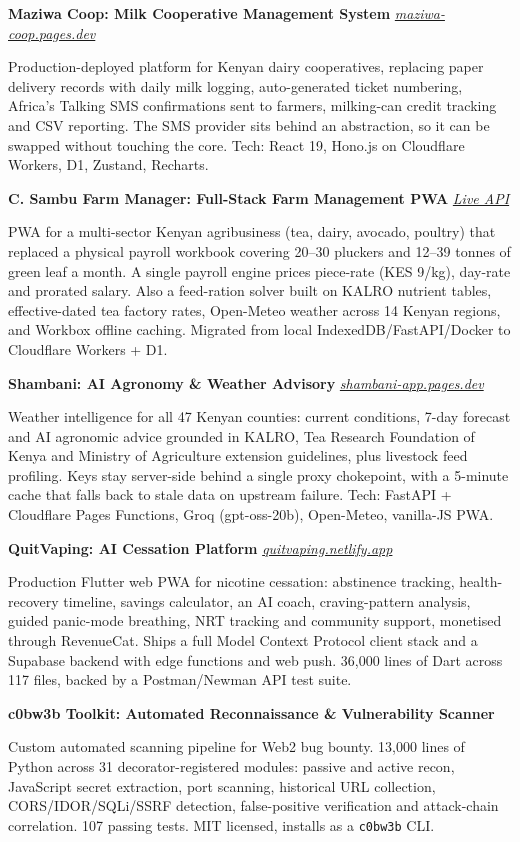 \documentclass[10pt,a4paper]{article}
\newcommand{\project}[2]{%
  \par\vspace{0.55em}%
  {\sffamily\bfseries #1}%
  \hfill{\small\itshape #2}\par%
  \vspace{0.15em}%
}
\begin{document}
\project{Maziwa Coop: Milk Cooperative Management System}
{\href{https://maziwa-coop.pages.dev}{maziwa-coop.pages.dev}}
\small
Production-deployed platform for Kenyan dairy cooperatives, replacing paper delivery records with daily milk logging, auto-generated ticket numbering, Africa's Talking SMS confirmations sent to farmers, milking-can credit tracking and CSV reporting. The SMS provider sits behind an abstraction, so it can be swapped without touching the core. Tech: React 19, Hono.js on Cloudflare Workers, D1, Zustand, Recharts.
\normalsize

\project{C. Sambu Farm Manager: Full-Stack Farm Management PWA}
  {\href{https://cs-farm-api.llakterian.workers.dev}{Live API}}
\small
PWA for a multi-sector Kenyan agribusiness (tea, dairy, avocado, poultry) that replaced a physical payroll workbook covering 20--30 pluckers and 12--39 tonnes of green leaf a month. A single payroll engine prices piece-rate (KES 9/kg), day-rate and prorated salary. Also a feed-ration solver built on KALRO nutrient tables, effective-dated tea factory rates, Open-Meteo weather across 14 Kenyan regions, and Workbox offline caching. Migrated from local IndexedDB/FastAPI/Docker to Cloudflare Workers + D1.
\normalsize

\project{Shambani: AI Agronomy \& Weather Advisory}
{\href{https://shambani-app.pages.dev}{shambani-app.pages.dev}}
\small
Weather intelligence for all 47 Kenyan counties: current conditions, 7-day forecast and AI agronomic advice grounded in KALRO, Tea Research Foundation of Kenya and Ministry of Agriculture extension guidelines, plus livestock feed profiling. Keys stay server-side behind a single proxy chokepoint, with a 5-minute cache that falls back to stale data on upstream failure. Tech: FastAPI + Cloudflare Pages Functions, Groq (gpt-oss-20b), Open-Meteo, vanilla-JS PWA.
\normalsize

\project{QuitVaping: AI Cessation Platform}
{\href{https://quitvaping.netlify.app}{quitvaping.netlify.app}}
\small
Production Flutter web PWA for nicotine cessation: abstinence tracking, health-recovery timeline, savings calculator, an AI coach, craving-pattern analysis, guided panic-mode breathing, NRT tracking and community support, monetised through RevenueCat. Ships a full Model Context Protocol client stack and a Supabase backend with edge functions and web push. 36,000 lines of Dart across 117 files, backed by a Postman/Newman API test suite.
\normalsize

\project{c0bw3b Toolkit: Automated Reconnaissance \& Vulnerability Scanner}{}
\small Custom automated scanning pipeline for Web2 bug bounty. 13,000 lines of Python across 31 decorator-registered modules: passive and active recon, JavaScript secret extraction, port scanning, historical URL collection, CORS/IDOR/SQLi/SSRF detection, false-positive verification and attack-chain correlation. 107 passing tests. MIT licensed, installs as a \texttt{c0bw3b} CLI.\normalsize
\end{document}
